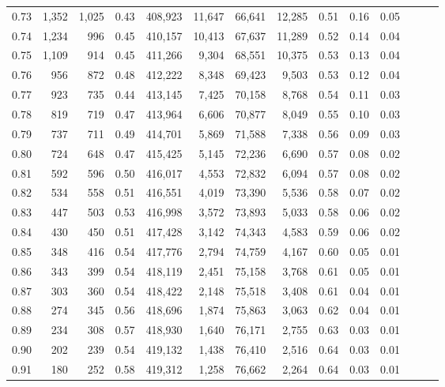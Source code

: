 \begin{tabular}{rrrrrrrrrrrrrr}
0.73 &  1,352 &  1,025 &  0.43 &  408,923 &   11,647 &  66,641 &  12,285 &  0.51 &  0.16 &      0.05 \\
0.74 &  1,234 &    996 &  0.45 &  410,157 &   10,413 &  67,637 &  11,289 &  0.52 &  0.14 &      0.04 \\
0.75 &  1,109 &    914 &  0.45 &  411,266 &    9,304 &  68,551 &  10,375 &  0.53 &  0.13 &      0.04 \\
0.76 &    956 &    872 &  0.48 &  412,222 &    8,348 &  69,423 &   9,503 &  0.53 &  0.12 &      0.04 \\
0.77 &    923 &    735 &  0.44 &  413,145 &    7,425 &  70,158 &   8,768 &  0.54 &  0.11 &      0.03 \\
0.78 &    819 &    719 &  0.47 &  413,964 &    6,606 &  70,877 &   8,049 &  0.55 &  0.10 &      0.03 \\
0.79 &    737 &    711 &  0.49 &  414,701 &    5,869 &  71,588 &   7,338 &  0.56 &  0.09 &      0.03 \\
0.80 &    724 &    648 &  0.47 &  415,425 &    5,145 &  72,236 &   6,690 &  0.57 &  0.08 &      0.02 \\
0.81 &    592 &    596 &  0.50 &  416,017 &    4,553 &  72,832 &   6,094 &  0.57 &  0.08 &      0.02 \\
0.82 &    534 &    558 &  0.51 &  416,551 &    4,019 &  73,390 &   5,536 &  0.58 &  0.07 &      0.02 \\
0.83 &    447 &    503 &  0.53 &  416,998 &    3,572 &  73,893 &   5,033 &  0.58 &  0.06 &      0.02 \\
0.84 &    430 &    450 &  0.51 &  417,428 &    3,142 &  74,343 &   4,583 &  0.59 &  0.06 &      0.02 \\
0.85 &    348 &    416 &  0.54 &  417,776 &    2,794 &  74,759 &   4,167 &  0.60 &  0.05 &      0.01 \\
0.86 &    343 &    399 &  0.54 &  418,119 &    2,451 &  75,158 &   3,768 &  0.61 &  0.05 &      0.01 \\
0.87 &    303 &    360 &  0.54 &  418,422 &    2,148 &  75,518 &   3,408 &  0.61 &  0.04 &      0.01 \\
0.88 &    274 &    345 &  0.56 &  418,696 &    1,874 &  75,863 &   3,063 &  0.62 &  0.04 &      0.01 \\
0.89 &    234 &    308 &  0.57 &  418,930 &    1,640 &  76,171 &   2,755 &  0.63 &  0.03 &      0.01 \\
0.90 &    202 &    239 &  0.54 &  419,132 &    1,438 &  76,410 &   2,516 &  0.64 &  0.03 &      0.01 \\
0.91 &    180 &    252 &  0.58 &  419,312 &    1,258 &  76,662 &   2,264 &  0.64 &  0.03 &      0.01 \\

\end{tabular}

